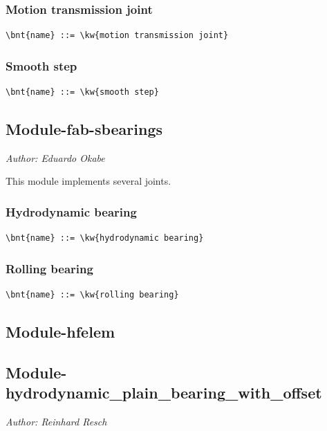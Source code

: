 \subsubsection{Motion transmission joint}
\begin{Verbatim}[commandchars=\\\{\}]
    \bnt{name} ::= \kw{motion transmission joint}
\end{Verbatim}

\subsubsection{Smooth step}
\begin{Verbatim}[commandchars=\\\{\}]
    \bnt{name} ::= \kw{smooth step}
\end{Verbatim}



\subsection{Module-fab-sbearings}
\emph{Author: Eduardo Okabe}

\noindent
This module implements several joints.

\subsubsection{Hydrodynamic bearing}
\begin{Verbatim}[commandchars=\\\{\}]
    \bnt{name} ::= \kw{hydrodynamic bearing}
\end{Verbatim}

\subsubsection{Rolling bearing}
\begin{Verbatim}[commandchars=\\\{\}]
    \bnt{name} ::= \kw{rolling bearing}
\end{Verbatim}



\subsection{Module-hfelem}




\subsection{Module-hydrodynamic\_plain\_bearing\_with\_offset}
\emph{Author: Reinhard Resch}

